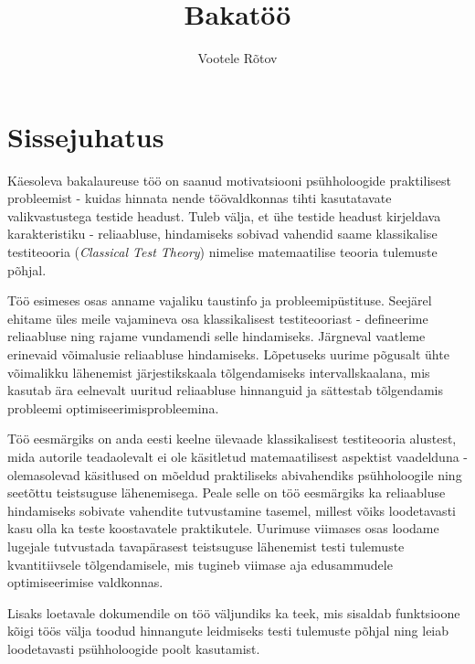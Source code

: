 \documentclass[a4paper,12pt]{article}
\author{Vootele Rõtov}
\title{Bakatöö}
\numberwithin{equation}{section}
\theoremstyle{definition}
\begin{document}
\maketitle

\pagebreak

\tableofcontents

\pagebreak

\section{Sissejuhatus}

Käesoleva bakalaureuse töö on saanud motivatsiooni psühholoogide praktilisest probleemist - kuidas hinnata nende töövaldkonnas tihti kasutatavate valikvastustega testide headust. Tuleb välja, et ühe testide headust kirjeldava karakteristiku - reliaabluse, hindamiseks sobivad vahendid saame klassikalise testiteooria (\textit{Classical Test Theory}) nimelise matemaatilise teooria tulemuste põhjal. 

Töö esimeses osas anname vajaliku taustinfo ja probleemipüstituse. Seejärel ehitame üles meile vajamineva osa klassikalisest testiteooriast - defineerime reliaabluse ning rajame vundamendi selle hindamiseks. Järgneval vaatleme erinevaid võimalusie reliaabluse hindamiseks. Lõpetuseks uurime põgusalt ühte võimalikku lähenemist järjestikskaala tõlgendamiseks intervallskaalana, mis kasutab ära eelnevalt uuritud reliaabluse hinnanguid ja sättestab tõlgendamis probleemi optimiseerimisprobleemina.

Töö eesmärgiks on anda eesti keelne ülevaade klassikalisest testiteooria alustest, mida autorile teadaolevalt ei ole käsitletud matemaatilisest aspektist vaadelduna - olemasolevad käsitlused on mõeldud praktiliseks abivahendiks psühholoogile ning seetõttu teistsuguse lähenemisega. Peale selle on töö eesmärgiks ka reliaabluse hindamiseks sobivate vahendite tutvustamine tasemel, millest võiks loodetavasti kasu olla ka teste koostavatele praktikutele. Uurimuse viimases osas loodame lugejale tutvustada tavapärasest teistsuguse lähenemist testi tulemuste kvantitiivsele tõlgendamisele, mis tugineb viimase aja edusammudele optimiseerimise valdkonnas.


Lisaks loetavale dokumendile on töö väljundiks ka teek, mis sisaldab funktsioone kõigi töös välja toodud hinnangute leidmiseks testi tulemuste põhjal ning leiab loodetavasti psühholoogide poolt kasutamist. 


\pagebreak
\end{document}
